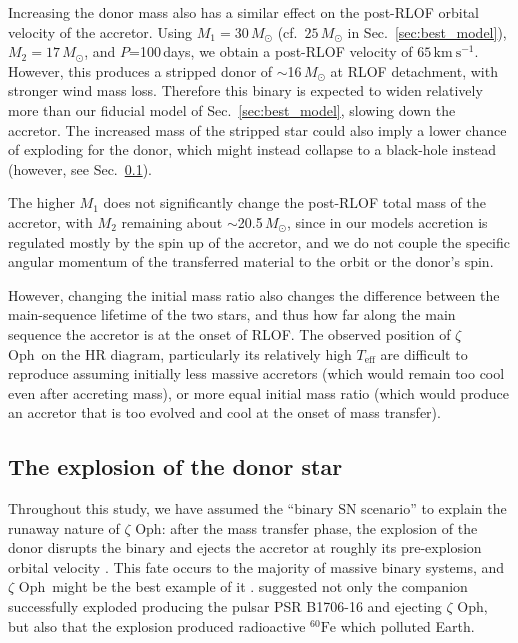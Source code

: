\documentclass[twocolumn,twocolappendix,trackchanges]{aastex63}
\newcommand{\kms}{{\mathrm{km\ s^{-1}}}}
\DeclareRobustCommand{\Secref}[1]{Sec.~\ref{#1}}
\newcommand{\zoph}{$\zeta$ Oph}
\begin{document}
Increasing the donor mass also has a similar effect on the post-RLOF orbital velocity of the accretor. Using
$M_1=30\,M_\odot$ (cf.\ $25\,M_\odot$ in \Secref{sec:best_model}),
$M_2=17\,M_\odot$, and
$P$=100\,days, we obtain a post-RLOF velocity of
$65\,\kms$. However, this produces a stripped donor of
$\sim$16\,$M_\odot$ at RLOF detachment, with stronger wind mass loss. Therefore this binary is expected to widen relatively more than our fiducial model of \Secref{sec:best_model}, slowing down the accretor. The increased mass of the stripped star could also imply a lower chance of exploding for the donor, which might instead collapse to a black-hole instead (however, see \Secref{sec:SN_comp}).

The higher $M_1$ does not significantly change the post-RLOF total
mass of the accretor, with $M_2$ remaining about $\sim$20.5\,$M_\odot$, since
in our models accretion is regulated mostly by the spin up of the
accretor, and we do not couple the specific angular momentum of the transferred
material to the orbit or the donor's spin.

However, changing the initial mass ratio also changes the difference
between the main-sequence lifetime of the two stars, and thus how far
along the main sequence the accretor is at the onset of RLOF. The observed
position of \zoph\ on the HR diagram, particularly its relatively high
$T_\mathrm{eff}$ are difficult to reproduce assuming initially less
massive accretors (which would remain too cool even after accreting
mass), or more equal initial mass ratio (which would produce an
accretor that is too evolved and cool at the onset of mass transfer).

\subsection{The explosion of the donor star}
\label{sec:SN_comp}

Throughout this study, we have assumed the ``binary SN scenario'' to
explain the runaway nature of \zoph:
after the mass transfer phase, the explosion of the donor disrupts the
binary and ejects the accretor at roughly its pre-explosion orbital
velocity \citep[e.g.,][]{renzo:19walk}. This fate occurs to the
majority of massive binary systems, and \zoph\ might be the best
example of it \citep[e.g.,][]{blaauw:52, blaauw:61,
  hoogerwerf:00}. \cite{neuhauser:20} suggested not only the companion
successfully exploded producing the pulsar PSR B1706-16 and ejecting
\zoph, but also that the
explosion produced radioactive $^{60}\mathrm{Fe}$ which polluted
Earth.
\end{document}
